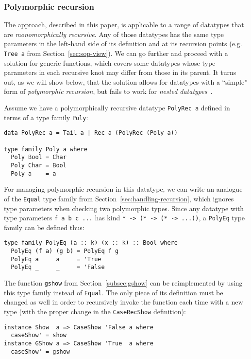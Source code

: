 \documentclass[runningheads]{llncs}
\newcommand{\K}[1]{\lstinline[style=fancy]{#1}}
\begin{document}
\subsubsection{Polymorphic recursion}

The approach, described in this paper, is applicable to a range of datatypes that are \emph{monomorphically recursive}. Any of those datatypes has the same type parameters in the left-hand side of its definition and at its recursion points (e.g. \K{Tree a} from Section~\ref{sec:sop-view}). We can go further and proceed with a solution for generic functions, which covers some datatypes whose type parameters in each recursive knot may differ from those in its parent. It turns out, as we will show below, that the solution allows for datatypes with a ``simple'' form of \emph{polymorphic recursion}, but fails to work for \emph{nested datatypes}~\cite{Bird1998}.

Assume we have a polymorphically recursive datatype \K{PolyRec a} defined in terms of a type family \K{Poly}:
\begin{lstlisting}[style=fancy]
data PolyRec a = Tail a | Rec a (PolyRec (Poly a))

type family Poly a where
  Poly Bool = Char
  Poly Char = Bool
  Poly a    = a
\end{lstlisting}

For managing polymorphic recursion in this datatype, we can write an analogue of the \K{Equal} type family from Section~\ref{sec:handling-recursion}, which ignores type parameters when checking two polymorphic types. Since any datatype with type parameters \K{f a b c ...} has kind \K{* -> (* -> (* -> ...))}, a \K{PolyEq} type family can be defined thus:
\begin{lstlisting}[style=fancy]
type family PolyEq (a :: k) (x :: k) :: Bool where
  PolyEq (f a) (g b) = PolyEq f g
  PolyEq a     a     = 'True
  PolyEq _     _     = 'False
\end{lstlisting}

The function \K{gshow} from Section~\ref{subsec:gshow} can be reimplemented by using this type family instead of \K{Equal}. The only piece of its definition must be changed as well in order to recursively invoke the function each time with a new type (with the proper change in the \K{CaseRecShow} definition):
\begin{lstlisting}[style=fancy]
instance Show  a => CaseShow 'False a where
  caseShow' = show
instance GShow a => CaseShow 'True  a where
  caseShow' = gshow
\end{lstlisting}
\end{document}
